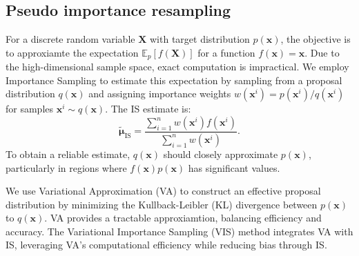 \documentclass[pdflatex,sn-mathphys-num]{sn-jnl}%
\theoremstyle{thmstyleone}%
\theoremstyle{thmstyletwo}%
\theoremstyle{thmstylethree}%
\begin{document}
\subsection{Pseudo importance resampling}
For a discrete random variable $\mathbf{X}$ with target distribution $p\left(\mathbf{x}\right)$, the objective is to approxiamte the expectation $\mathbb{E}_{p}[f\left( \mathbf{X} \right)]$ for a function $f\left(\mathbf{x}\right) = \mathbf{x}$. Due to the high-dimensional sample space, exact computation is impractical. We employ Importance Sampling to estimate this expectation by sampling from a proposal distribution $q\left(\mathbf{x}\right)$ and assigning importance weights $w\left( \mathbf{x}^{i} \right) = p\left(\mathbf{x}^{i}\right)/q\left(\mathbf{x}^{i}\right)$ for samples $\mathbf{x}^i \sim q\left(\mathbf{x}\right)$. The IS estimate is:
\begin{equation}
    \tilde{\boldsymbol{\mu}}_{\operatorname{IS}} =  \frac{\sum_{i=1}^{n}w\left( \mathbf{x}^{i} \right) f\left( \mathbf{x}^{i} \right)}{\sum_{i=1}^n w\left( \mathbf{x}^{i} \right)}.
\end{equation}
To obtain a reliable estimate, $q\left(\mathbf{x}\right)$ should closely approximate $p\left(\mathbf{x}\right)$, particularly in regions where $f\left(\mathbf{x}\right)p\left(\mathbf{x}\right)$ has significant values.

We use Variational Approximation (VA) to construct an effective proposal distribution by minimizing the Kullback-Leibler (KL) divergence between $p\left(\mathbf{x}\right)$ to $q\left(\mathbf{x}\right)$. VA provides a tractable approxiamtion, balancing efficiency and accuracy. The Variational Importance Sampling (VIS) method integrates VA with IS, leveraging VA's computational efficiency while reducing bias through IS.
\end{document}

